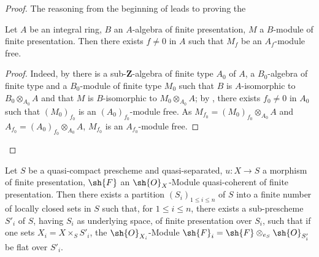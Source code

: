 \begin{proof}
The reasoning from the beginning of  leads to proving the

\begin{lemma}[8.9.4.1]
\label{IV.8.9.4.1}
Let $A$ be an integral ring, $B$ an $A$-algebra of finite presentation, $M$ a $B$-module of finite presentation.
Then there exists $f\neq 0$ in $A$ such that $M_f$ be an $A_f$-module free.
\end{lemma}

\begin{proof}
Indeed, by  there is a sub-$\mathbf{Z}$-algebra of finite type $A_0$ of $A$, a $B_0$-algebra of finite type and a $B_0$-module of finite type $M_0$ such that $B$ is $A$-isomorphic to $B_0\otimes_{A_0}A$ and that $M$ is $B$-isomorphic to $M_0\otimes_{A_0}A$; by , there exists $f_0\neq 0$ in $A_0$ such that $(M_0)_{f_0}$ is an $(A_0)_{f_0}$-module free.
As $M_{f_0}=(M_0)_{f_0}\otimes_{A_0}A$ and $A_{f_0}=(A_0)_{f_0}\otimes_{A_0}A$, $M_{f_0}$ is an $A_{f_0}$-module free.
\end{proof}
\end{proof}

\begin{corollary}[8.9.5]
\label{IV.8.9.5}
Let $S$ be a quasi-compact prescheme and quasi-separated, $u:X\to S$ a morphism of finite presentation, $\sh{F}$ an $\sh{O}_X$-Module quasi-coherent of finite presentation.
Then there exists a partition $(S_i)_{1\leqslant i\leqslant n}$ of $S$ into a finite number of locally closed sets in $S$ such that, for $1\leqslant i\leqslant n$, there exists a sub-prescheme $S'_i$ of $S$, having $S_i$ as underlying space, of finite presentation over $S_i$, such that if one sets $X_i=X\times_S S'_i$, the $\sh{O}_{X_i}$-Module $\sh{F}_i=\sh{F}\otimes_{e_S}\sh{O}_{S'_i}$ be flat over $S'_i$.
\end{corollary}

